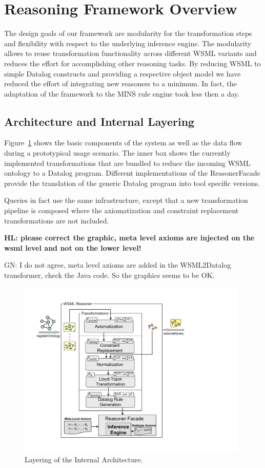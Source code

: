 \section{Reasoning Framework Overview\label{sec:framework}}

The design goals of our framework are modularity for the
transformation steps and flexibility with respect to the underlying
inference engine. The modularity allows to reuse transformation
functionality across different WSML variants and reduces the effort
for accomplishing other reasoning tasks. By reducing WSML to simple
Datalog constructs and providing a respective object model we have
reduced the effort of integrating new reasoners to a minimum. In
fact, the adaptation of the framework to the MINS rule engine took
less then a day.

\subsection{Architecture and Internal Layering}
Figure~\ref{fig:layering} shows the basic components of the system
as well as the data flow during a prototypical usage scenario. The
inner box shows the currently implemented transformations that are
bundled to reduce the incoming WSML ontology to a Datalog program.
Different implementations of the ReasonerFacade provide the
translation of the generic Datalog program into tool specific versions. 

Queries in fact use the same infrastructure, except that a new transformation pipeline is
composed where the axiomatization and constraint replacement transformations are not included.

{\bf HL: please correct the graphic, meta level axioms are injected
on the wsml level and not on the lower level!

GN: I do not agree, meta level axioms are added in the WSML2Datalog transformer, check the Java code. So the graphics seems to be OK.}

\begin{figure}[h]
    \includegraphics[width=11cm]{figures/layering}
    \centering
    \caption{Layering of the Internal Architecture. \label{fig:layering}}
\end{figure}


